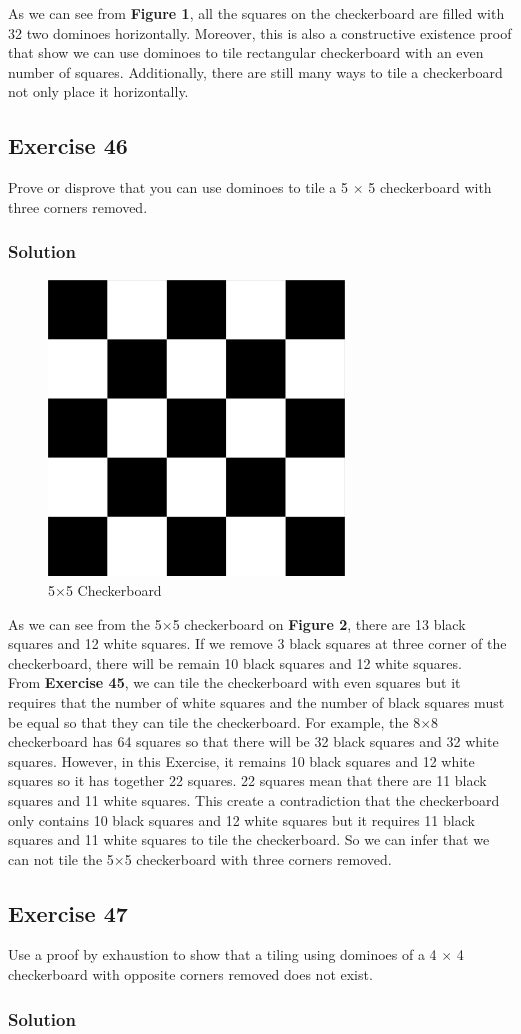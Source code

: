\documentclass{article}
\begin{document}
As we can see from \textbf{Figure 1}, all the squares on the checkerboard are filled with 32 two dominoes horizontally. Moreover, this is also a constructive existence proof that show we can use dominoes to tile rectangular checkerboard
with an even number of squares. Additionally, there are still many ways to tile a checkerboard
not only place it horizontally.
\subsection*{Exercise 46}
Prove or disprove that you can use dominoes to tile a 5 $\times$ 5 checkerboard with three corners removed.
\subsubsection*{Solution}
\clearpage
\begin{figure}
    \begin{center}
        \includegraphics[width = 0.7\textwidth]{5x5Checkerboard-01.png}
    \end{center}
    \caption{5$\times$5 Checkerboard}
\end{figure}
As we can see from the 5$\times$5 checkerboard on \textbf{Figure 2}, there are 13 black squares
and 12 white squares. If we remove 3 black squares at three corner of the checkerboard,
there will be remain 10 black squares and 12 white squares. \\

From \textbf{Exercise 45}, we can tile the checkerboard with even squares but it requires that the number of white squares
and the number of black squares must be equal so that they can tile the checkerboard. For example,
the 8$\times$8 checkerboard has 64 squares so that there will be 32 black squares and 32 white squares.
However, in this Exercise, it remains 10 black squares and 12 white squares
so it has together 22 squares. 22 squares mean that there are 11 black squares
and 11 white squares. This create a contradiction that the checkerboard only contains
10 black squares and 12 white squares but it requires 11 black squares and 11
white squares to tile the checkerboard. So we can infer that we can not tile the 5$\times$5
checkerboard with three corners removed.
\subsection*{Exercise 47}
Use a proof by exhaustion to show that a tiling using
dominoes of a 4 $\times$ 4 checkerboard with opposite corners
removed does not exist.
\subsubsection*{Solution}
\end{document}
